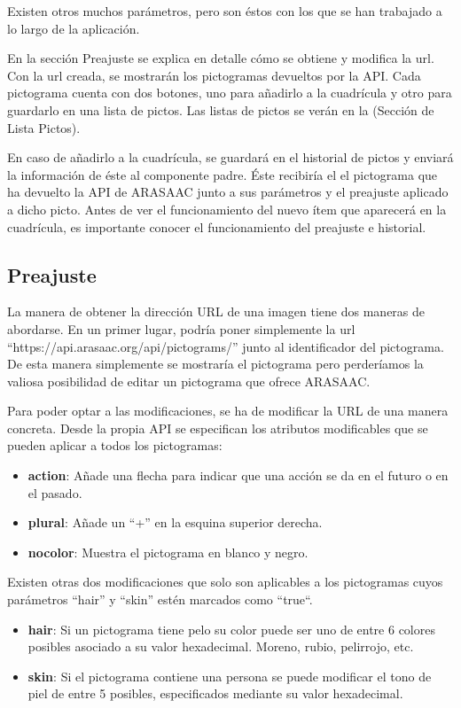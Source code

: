 Existen otros muchos parámetros, pero son éstos con los que se han trabajado a lo largo de la aplicación.

En la sección Preajuste se explica en detalle cómo se obtiene y modifica la url. Con la url creada, se mostrarán los pictogramas devueltos por la API. Cada pictograma cuenta con dos botones, uno para añadirlo a la cuadrícula y otro para guardarlo en una lista de pictos. Las listas de pictos se verán en la (Sección de Lista Pictos). 

En caso de añadirlo a la cuadrícula, se guardará en el historial de pictos y enviará la información de éste al componente padre. Éste recibiría el el pictograma que ha devuelto la API de ARASAAC junto a sus parámetros y el preajuste aplicado a dicho picto. Antes de ver el funcionamiento del nuevo ítem que aparecerá en la cuadrícula, es importante conocer el funcionamiento del preajuste e historial.


\subsection{Preajuste}

La manera de obtener la dirección URL de una imagen tiene dos maneras de abordarse. En un primer lugar, podría poner simplemente la url “https://api.arasaac.org/api/pictograms/” junto al identificador del pictograma. De esta manera simplemente se mostraría el pictograma pero perderíamos la valiosa posibilidad de editar un pictograma que ofrece ARASAAC. 

Para poder optar a las modificaciones, se ha de modificar la URL de una manera concreta. Desde la propia API se especifican los atributos modificables que se pueden aplicar a todos los pictogramas:  


\begin{itemize}
	\item \textbf{action}: Añade una flecha para indicar que una acción se da en el futuro o en el pasado.
	\item \textbf{plural}: Añade un “+” en la esquina superior derecha.
	\item \textbf{nocolor}: Muestra el pictograma en blanco y negro.
	 	
\end{itemize}

Existen otras dos modificaciones que solo son aplicables a los pictogramas cuyos parámetros “hair” y “skin” estén marcados como “true“.


\begin{itemize}
	\item \textbf{hair}: Si un pictograma tiene pelo su color puede ser uno de entre 6 colores posibles asociado a su valor hexadecimal. Moreno, rubio, pelirrojo, etc.

	\item \textbf{skin}: Si el pictograma contiene una persona se puede modificar el tono de piel de entre 5 posibles, especificados mediante su valor hexadecimal. 
	
\end{itemize}

